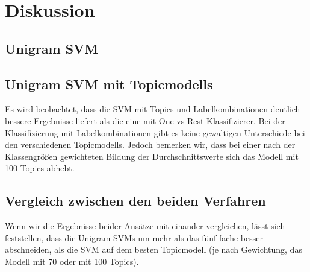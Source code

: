 \section{Diskussion}

\subsection{Unigram SVM}

\subsection{Unigram SVM mit Topicmodells}
Es wird beobachtet, dass die SVM mit Topics und Labelkombinationen deutlich bessere Ergebnisse liefert als die eine mit One-vs-Rest Klassifizierer.
Bei der Klassifizierung mit Labelkombinationen gibt es keine gewaltigen Unterschiede bei den verschiedenen Topicmodells.
Jedoch bemerken wir, dass bei einer nach der Klassengrößen gewichteten Bildung der Durchschnittswerte sich das Modell mit 100 Topics abhebt.

\subsection{Vergleich zwischen den beiden Verfahren}
Wenn wir die Ergebnisse beider Ansätze mit einander vergleichen, lässt sich feststellen, dass die Unigram SVMs um mehr als das fünf-fache besser abschneiden, als die SVM auf dem besten Topicmodell
(je nach Gewichtung, das Modell mit 70 oder mit 100 Topics).


